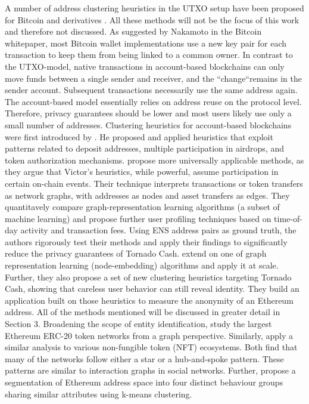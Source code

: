 \documentclass[12pt,a4paper,titlepage,oneside,english]{article}
\begin{document}
A number of address clustering heuristics in the UTXO setup have been proposed for Bitcoin and derivatives \citep{Androulaki2013, Meiklejohn2013, Haslhofer2016, jourdan2018, kappos2022}. All these methods will not be the focus of this work and therefore not discussed. As suggested by Nakamoto in the Bitcoin whitepaper, most Bitcoin wallet implementations use a new key pair for each transaction to keep them from being linked to a common owner. \newline
In contrast to the UTXO-model, native transactions in account-based blockchains can only move funds between a single sender and receiver, and the ``change``remains in the sender account. Subsequent transactions necessarily use the same address again. The account-based model essentially relies on address reuse on the protocol level. Therefore, privacy guarantees should be lower and most users likely use only a small number of addresses. \citep{Beres2020} \newline
Clustering heuristics for account-based blockchains were first introduced by \cite{FV:17}. He proposed and applied heuristics that exploit patterns related to deposit addresses, multiple participation in airdrops, and token authorization mechanisms. \newline
\cite{Beres2020} propose more universally applicable methods, as they argue that Victor’s heuristics, while powerful, assume participation in certain on-chain events. Their technique interprets transactions or token transfers as network graphs, with addresses as nodes and asset transfers as edges. They quantitavely compare graph-representation learning algorithms (a subset of machine learning) and propose further user profiling techniques based on time-of-day activity and transaction fees. Using ENS address pairs as ground truth, the authors rigorously test their methods and apply their findings to significantly reduce the privacy guarantees of Tornado Cash. \newline
\cite{wu2022tutela} extend on one of \cite{Beres2020} graph representation learning (node-embedding) algorithms and apply it at scale. Further, they also propose a set of new clustering heuristics targeting Tornado Cash, showing that careless user behavior can still reveal identity. They build an application built on those heuristics to measure the anonymity of an Ethereum address. All of the methods mentioned will be discussed in greater detail in Section 3. \newline
Broadening the scope of entity identification, \cite{victorlüders2019} study the largest Ethereum ERC-20 token networks from a graph perspective. Similarly, \cite{casalebrunet2021} apply a similar analysis to various non-fungible token (NFT) ecosystems. Both find that many of the networks follow either a star or a hub-and-spoke pattern. These patterns are similar to interaction graphs in social networks. Further, \cite{Payette2017} propose a segmentation of Ethereum address space into four distinct behaviour groups sharing similar attributes using k-means clustering. \newline
\end{document}

